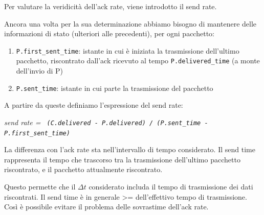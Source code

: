 Per valutare la veridicità dell'ack rate, viene introdotto il send rate. \bigskip

Ancora una volta per la sua determinazione abbiamo bisogno di mantenere delle informazioni di stato (ulteriori alle precedenti), per ogni pacchetto:

\begin{enumerate}

\item \texttt{P.first\_sent\_time}: istante in cui è iniziata la trasmissione dell’ultimo pacchetto, riscontrato dall’ack ricevuto al tempo \texttt{P.delivered\_time} (a monte dell’invio di P) 
\item \texttt{P.sent\_time}: istante in cui parte la trasmissione del pacchetto

\end{enumerate}

A partire da queste definiamo l'espressione del send rate:

\begin{center}
 
\textit{send rate = \texttt{ (C.delivered - P.delivered) / (P.sent\_time - P.first\_sent\_time)}}

\end{center}

La differenza con l'ack rate sta nell'intervallo di tempo considerato. Il send time rappresenta il tempo che trascorso tra la trasmissione dell'ultimo pacchetto riscontrato, e il pacchetto attualmente riscontrato. \bigskip

Questo permette che il $\Delta t$ considerato includa il tempo di trasmissione dei dati riscontrati. Il send time è in generale >= dell'effettivo tempo di trasmissione. Così è possibile evitare il problema delle sovrastime dell'ack rate. \bigskip

